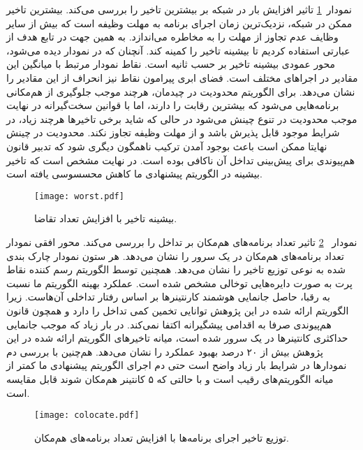 نمودار~\ref{figure:worst_plot} تاثیر افزایش بار در شبکه بر بیشترین تاخیر را بررسی می‌کند. بیشترین تاخیر ممکن در شبکه، نزدیک‌ترین زمان اجرای برنامه به مهلت وظیفه است که بیش از سایر وظایف عدم تجاوز از مهلت را به مخاطره می‌اندازد. به همین جهت در تابع هدف از عبارتی استفاده کردیم تا بیشینه تاخیر را کمینه کند. آنچنان که در نمودار دیده می‌شود، محور عمودی بیشینه تاخیر بر حسب ثانیه است. نقاط نمودار مرتبط با میانگین این مقادیر در اجراهای مختلف است. فضای ابری پیرامون نقاط نیز انحراف از این مقادیر را نشان می‌دهد. برای الگوریتم محدودیت در چیدمان، هرچند موجب جلوگیری از هم‌مکانی برنامه‌هایی می‌شود که بیشترین رقابت را دارند، اما با قوانین سخت‌گیرانه در نهایت موجب محدودیت در تنوع چینش می‌شود در حالی که شاید برخی تاخیرها هرچند زیاد، در شرایط موجود قابل پذیرش باشد و از مهلت وظیفه تجاوز نکند. محدودیت در چینش نهایتا ممکن است باعث بوجود آمدن ترکیب ناهمگون دیگری شود که تدبیر قانون هم‌پیوندی برای پیش‌بینی تداخل آن ناکافی بوده است. در نهایت مشخص است که تاخیر بیشینه در الگوریتم پیشنهادی ما کاهش محسسوسی یافته است.

\vspace{0.5cm}
\begin{figure}[h]
\centering
\texttt{[image: worst.pdf]}
\caption{بیشینه تاخیر با افزایش تعداد تقاضا.}
\label{figure:worst_plot}
\end{figure}
\vspace{0.5cm}

نمودار ~\ref{figure:colocate_plot} تاثیر تعداد برنامه‌های هم‌مکان بر تداخل را بررسی می‌کند. محور افقی نمودار تعداد برنامه‌های هم‌مکان در یک سرور را نشان می‌دهد. هر ستون نمودار چارک بندی شده به نوعی توزیع تاخیر را نشان می‌دهد. همچنین توسط الگوریتم رسم کننده نقاط پرت به صورت دایره‌هایی توخالی مشخص شده است. عملکرد بهینه الگوریتم ما نسبت به رقبا، حاصل جانمایی هوشمند کارنتینرها بر اساس رفتار تداخلی آن‌هاست. زیرا الگوریتم ارائه شده در این پژوهش توانایی تخمین کمی تداخل را دارد و همچون قانون هم‌پیوندی صرفا به اقدامی پیشگیرانه اکتفا نمی‌کند. در بار زیاد که موجب جانمایی حداکثری کانتینرها در یک سرور شده است، میانه تاخیرهای الگوریتم ارائه شده در این پژوهش بیش از ۲۰ درصد بهبود عملکرد را نشان می‌دهد. هم‌چنین با بررسی دم نمودارها در شرایط بار زیاد واضح است حتی دم اجرای الگوریتم پیشنهادی ما کمتر از میانه الگوریتم‌های رقیب است و با حالتی که ۵ کانتینر هم‌مکان شوند قابل مقایسه است.

\vspace{0.5cm}
\begin{figure}[h]
\centering
\texttt{[image: colocate.pdf]}
\caption{توزیع تاخیر اجرای برنامه‌ها با افزایش تعداد برنامه‌های هم‌مکان.}
\label{figure:colocate_plot}
\end{figure}
\vspace{0.5cm}

